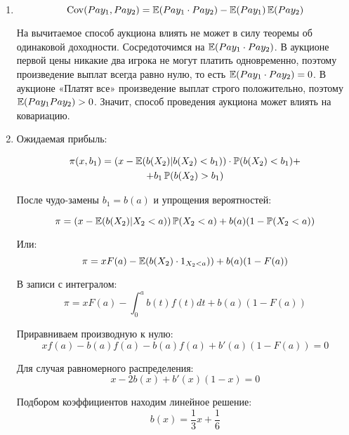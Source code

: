 

\begin{enumerate}
\item

\begin{equation}
\operatorname{Cov}(Pay_{1}, Pay_{2})=\operatorname{\mathbb{E}}(Pay_{1}\cdot Pay_{2})-\operatorname{\mathbb{E}}(Pay_{1})\operatorname{\mathbb{E}}(Pay_{2})
\end{equation}

На вычитаемое способ аукциона влиять не может в силу теоремы об одинаковой доходности. Сосредоточимся на $\operatorname{\mathbb{E}}(Pay_{1}\cdot Pay_{2})$. В аукционе первой цены никакие два игрока не могут платить одновременно, поэтому произведение выплат всегда равно нулю, то есть $ \operatorname{\mathbb{E}}(Pay_{1}\cdot Pay_{2})=0 $. В аукционе «Платят все» произведение выплат строго положительно, поэтому $ \operatorname{\mathbb{E}}(Pay_{1}Pay_{2})>0 $. Значит, способ проведения аукциона может влиять на ковариацию.



\item  Ожидаемая прибыль:

\begin{multline}
\pi(x,b_{1})=(x-\operatorname{\mathbb{E}}(b(X_{2})|b(X_{2})<b_{1}))\cdot \operatorname{\mathbb{P}}(b(X_{2})<b_{1})+\\
+b_{1}\operatorname{\mathbb{P}}(b(X_{2})>b_{1})
\end{multline}

После чудо-замены $ b_{1}=b(a) $ и упрощения вероятностей:

\begin{equation}
\pi=(x-\operatorname{\mathbb{E}}(b(X_{2})|X_{2}<a))\operatorname{\mathbb{P}}(X_{2}<a)+b(a)(1-\operatorname{\mathbb{P}}(X_{2}<a))
\end{equation}

Или:
\begin{equation}
\pi=xF(a)-\operatorname{\mathbb{E}}(b(X_{2})\cdot 1_{X_{2}<a}))+b(a)(1-F(a))
\end{equation}

В записи с интегралом:
\begin{equation}
\pi=xF(a)-\int_{0}^{a}b(t)f(t)dt+b(a)(1-F(a))
\end{equation}

Приравниваем производную к нулю:
\begin{equation}
xf(a)-b(a)f(a)-b(a)f(a)+b'(a)(1-F(a))=0
\end{equation}

Для случая равномерного распределения:
\begin{equation}
x-2b(x)+b'(x)(1-x)=0
\end{equation}

Подбором коэффициентов находим линейное решение:
\begin{equation}
b(x)=\frac{1}{3}x+\frac{1}{6}
\end{equation}



\end{enumerate}
